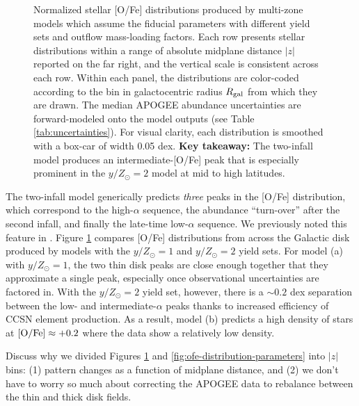 \documentclass[twocolumn,twocolappendix,linenumbers]{aastex631}
\newcommand{\todo}[1]{{\color{red}#1}}
\newcommand{\mathOFe}{{\rm [O/Fe]}}
\newcommand{\yZ}[1]{$y/Z_\odot=#1$}
\begin{document}
\begin{figure}
    \caption{Normalized stellar [O/Fe] distributions produced by multi-zone models which assume the fiducial parameters with different yield sets and outflow mass-loading factors. Each row presents stellar distributions within a range of absolute midplane distance $|z|$ reported on the far right, and the vertical scale is consistent across each row. Within each panel, the distributions are color-coded according to the bin in galactocentric radius $R_{\rm gal}$ from which they are drawn. The median APOGEE abundance uncertainties are forward-modeled onto the model outputs (see Table \ref{tab:uncertainties}). For visual clarity, each distribution is smoothed with a box-car of width 0.05 dex. {\bf Key takeaway:} The two-infall model produces an intermediate-[O/Fe] peak that is especially prominent in the \yZ{2} model at mid to high latitudes.}
    \label{fig:ofe-distribution-yields}
\end{figure}

The two-infall model generically predicts {\it three} peaks in the [O/Fe] distribution, which correspond to the high-$\alpha$ sequence, the abundance ``turn-over'' after the second infall, and finally the late-time low-$\alpha$ sequence. We previously noted this feature in \citet{dubay_galactic_2024}. Figure \ref{fig:ofe-distribution-yields} compares [O/Fe] distributions from across the Galactic disk produced by models with the \yZ{1} and \yZ{2} yield sets. For model (a) with $y/Z_\odot=1$, the two thin disk peaks are close enough together that they approximate a single peak, especially once observational uncertainties are factored in. With the \yZ{2} yield set, however, there is a $\sim0.2$ dex separation between the low- and intermediate-$\alpha$ peaks thanks to increased efficiency of CCSN element production. As a result, model (b) predicts a high density of stars at $\mathOFe\approx+0.2$ where the data show a relatively low density.

\todo{Discuss why we divided Figures \ref{fig:ofe-distribution-yields} and \ref{fig:ofe-distribution-parameters} into $|z|$ bins: (1) pattern changes as a function of midplane distance, and (2) we don't have to worry so much about correcting the APOGEE data to rebalance between the thin and thick disk fields.}
\end{document}
